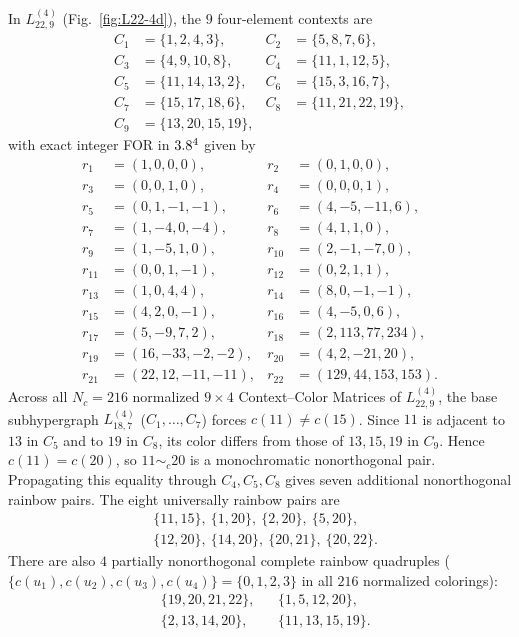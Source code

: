\documentclass[aps,pra,reprint,superscriptaddress,longbibliography,nofootinbib,floatfix,10pt]{revtex4-2}
\theoremstyle{definition}\newtheorem{definition}[theorem]{Definition}
\theoremstyle{remark}\newtheorem{remark}[theorem]{Remark}
\begin{document}
In $L_{22,9}^{(4)}$ (Fig.~\ref{fig:L22-4d}), the $9$ four-element contexts are
\begin{equation}\label{eq:L22-contexts}
\begin{aligned}
C_1&=\{1,2,4,3\},& C_2&=\{5,8,7,6\},\\
C_3&=\{4,9,10,8\},& C_4&=\{11,1,12,5\},\\
C_5&=\{11,14,13,2\},& C_6&=\{15,3,16,7\},\\
C_7&=\{15,17,18,6\},& C_8&=\{11,21,22,19\},\\
C_9&=\{13,20,15,19\},&&
\end{aligned}
\end{equation}
with exact integer FOR in $3.8^4$ given by
\begin{equation}\label{eq:L22-vectors}
\begin{aligned}
r_1&=(1,0,0,0),& r_2&=(0,1,0,0),\\
r_3&=(0,0,1,0),& r_4&=(0,0,0,1),\\
r_5&=(0,1,-1,-1),& r_6&=(4,-5,-11,6),\\
r_7&=(1,-4,0,-4),& r_8&=(4,1,1,0),\\
r_9&=(1,-5,1,0),& r_{10}&=(2,-1,-7,0),\\
r_{11}&=(0,0,1,-1),& r_{12}&=(0,2,1,1),\\
r_{13}&=(1,0,4,4),& r_{14}&=(8,0,-1,-1),\\
r_{15}&=(4,2,0,-1),& r_{16}&=(4,-5,0,6),\\
r_{17}&=(5,-9,7,2),& r_{18}&=(2,113,77,234),\\
r_{19}&=(16,-33,-2,-2),& r_{20}&=(4,2,-21,20),\\
r_{21}&=(22,12,-11,-11),& r_{22}&=(129,44,153,153).
\end{aligned}
\end{equation}
Across all $N_c=216$ normalized $9\times4$ Context--Color Matrices of $L_{22,9}^{(4)}$, the base subhypergraph $L_{18,7}^{(4)}$ ($C_1,\ldots,C_7$) forces $c(11)\neq c(15)$. Since $11$ is adjacent to $13$ in $C_5$ and to $19$ in $C_8$, its color differs from those of $13,15,19$ in $C_9$. Hence $c(11)=c(20)$, so $11\sim_c20$ is a monochromatic nonorthogonal pair. Propagating this equality through $C_4,C_5,C_8$ gives seven additional nonorthogonal rainbow pairs. The eight universally rainbow pairs are
\begin{equation}\label{eq:L22-rainbow-pairs}
\begin{aligned}
&\{11,15\},\ \{1,20\},\ \{2,20\},\ \{5,20\},\\
&\{12,20\},\ \{14,20\},\ \{20,21\},\ \{20,22\}.
\end{aligned}
\end{equation}
There are also $4$ partially nonorthogonal complete rainbow quadruples ($\{c(u_1),c(u_2),c(u_3),c(u_4)\}=\{0,1,2,3\}$ in all $216$ normalized colorings):
\begin{equation}\label{eq:L22-complete4}
\begin{aligned}
&\{19,20,21,22\},& &\{1,5,12,20\},\\
&\{2,13,14,20\},& &\{11,13,15,19\}.
\end{aligned}
\end{equation}
\end{document}
